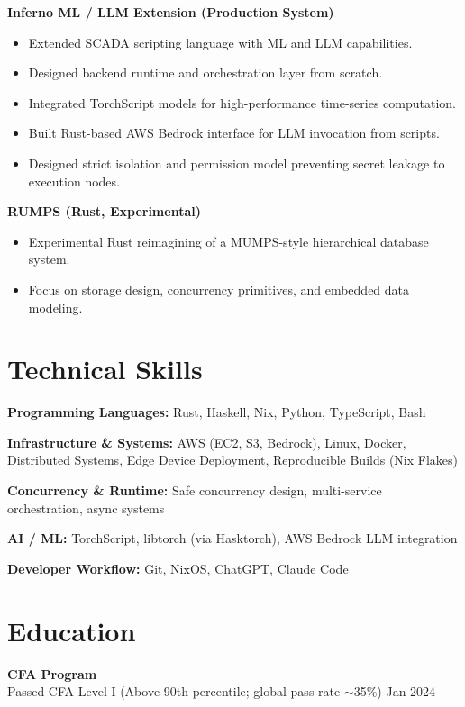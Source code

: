 \documentclass[11pt]{article}
\begin{document}
\textbf{Inferno ML / LLM Extension (Production System)}

\begin{itemize}
    \item Extended SCADA scripting language with ML and LLM capabilities.
    \item Designed backend runtime and orchestration layer from scratch.
    \item Integrated TorchScript models for high-performance time-series computation.
    \item Built Rust-based AWS Bedrock interface for LLM invocation from scripts.
    \item Designed strict isolation and permission model preventing secret leakage to execution nodes.
\end{itemize}

\vspace{6pt}

\textbf{RUMPS (Rust, Experimental)}

\begin{itemize}
    \item Experimental Rust reimagining of a MUMPS-style hierarchical database system.
    \item Focus on storage design, concurrency primitives, and embedded data modeling.
\end{itemize}

\section*{Technical Skills}

\textbf{Programming Languages:} Rust, Haskell, Nix, Python, TypeScript, Bash

\textbf{Infrastructure \& Systems:} AWS (EC2, S3, Bedrock), Linux, Docker, Distributed Systems, Edge Device Deployment, Reproducible Builds (Nix Flakes)

\textbf{Concurrency \& Runtime:} Safe concurrency design, multi-service orchestration, async systems

\textbf{AI / ML:} TorchScript, libtorch (via Hasktorch), AWS Bedrock LLM integration

\textbf{Developer Workflow:} Git, NixOS, ChatGPT, Claude Code

\section*{Education}

\textbf{CFA Program} \\
Passed CFA Level I (Above 90th percentile; global pass rate $\sim$35\%) \hfill Jan 2024
\end{document}
